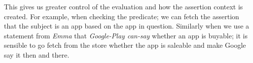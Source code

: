 \documentclass[]{llncs}
\begin{document}

This gives us greater control of the evaluation and how the assertion context is created.
For example, when checking the  predicate;
  we can fetch the assertion that the subject is an app based on the app in question.
Similarly when we use a statement from \emph{Emma} that \emph{Google-Play can-say} whether an app is buyable;
  it is sensible to go fetch from the store whether the app is saleable and make Google say it then and there.

\end{document}
